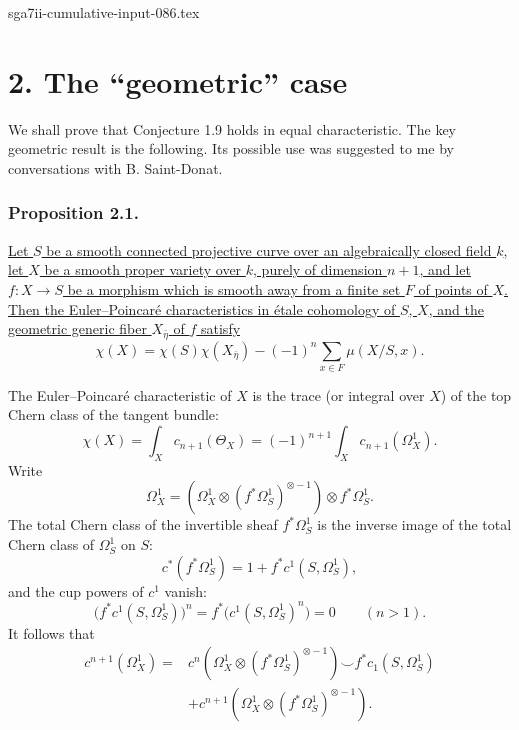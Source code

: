 \begin{filecontents*}{sga7ii-cumulative-input-086.tex}
\section*{2. The ``geometric'' case}

We shall prove that Conjecture 1.9 holds in equal characteristic.
The key geometric result is the following.  Its possible use was
suggested to me by conversations with B. Saint-Donat.

\subsubsection*{Proposition 2.1.}
\underline{Let $S$ be a smooth connected projective curve over an
algebraically closed field $k$, let $X$ be a smooth proper variety
over $k$, purely of dimension $n+1$, and let $f:X\to S$ be a
morphism which is smooth away from a finite set $F$ of points of
$X$.  Then the Euler--Poincar\'e characteristics in \'etale
cohomology of $S$, $X$, and the geometric generic fiber
$X_{\bar\eta}$ of $f$ satisfy}
\begin{equation}\tag{2.1.1}
\chi(X)=\chi(S)\chi(X_{\bar\eta})
-(-1)^n\sum_{x\in F}\mu(X/S,x).
\end{equation}

The Euler--Poincar\'e characteristic of $X$ is the trace (or integral
over $X$) of the top Chern class of the tangent bundle:
\[
\chi(X)=\int_Xc_{n+1}(\Theta_X)
=(-1)^{n+1}\int_Xc_{n+1}(\Omega_X^1).
\]
Write
\[
\Omega_X^1=\left(\Omega_X^1\otimes
(f^*\Omega_S^1)^{\otimes-1}\right)\otimes f^*\Omega_S^1.
\]
The total Chern class of the invertible sheaf $f^*\Omega_S^1$ is
the inverse image of the total Chern class of $\Omega_S^1$ on $S$:
\[
c^*(f^*\Omega_S^1)=1+f^*c^1(S,\Omega_S^1),
\]
and the cup powers of $c^1$ vanish:
\[
\bigl(f^*c^1(S,\Omega_S^1)\bigr)^n
=f^*\bigl(c^1(S,\Omega_S^1)^n\bigr)=0
\qquad(n>1).
\]
It follows that
\begin{align*}
c^{n+1}(\Omega_X^1)
={}&c^n\!\left(\Omega_X^1\otimes
(f^*\Omega_S^1)^{\otimes-1}\right)
\smile f^*c_1(S,\Omega_S^1)\\
&+c^{n+1}\!\left(\Omega_X^1\otimes
(f^*\Omega_S^1)^{\otimes-1}\right).
\end{align*}


\end{filecontents*}
